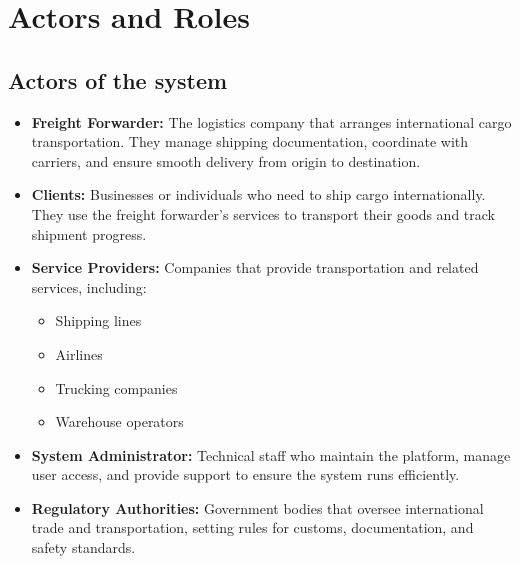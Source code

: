 \section{Actors and Roles}
\subsection{Actors of the system}
\begin{itemize}
\item \textbf{Freight Forwarder:} The logistics company that arranges international cargo transportation. They manage shipping documentation, coordinate with carriers, and ensure smooth delivery from origin to destination.

\item \textbf{Clients:} Businesses or individuals who need to ship cargo internationally. They use the freight forwarder's services to transport their goods and track shipment progress.

\item \textbf{Service Providers:} Companies that provide transportation and related services, including:
\begin{itemize}
\item Shipping lines
\item Airlines
\item Trucking companies
\item Warehouse operators
\end{itemize}

\item \textbf{System Administrator:} Technical staff who maintain the platform, manage user access, and provide support to ensure the system runs efficiently.

\item \textbf{Regulatory Authorities:} Government bodies that oversee international trade and transportation, setting rules for customs, documentation, and safety standards.
\end{itemize}
